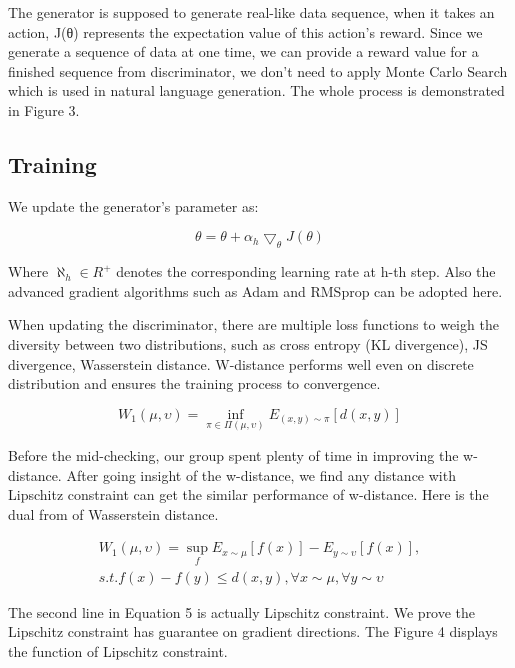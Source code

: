 \documentclass{acmtog} %
\begin{document}
The generator is supposed to generate real-like data sequence, when it takes an action, J(θ) represents the expectation value of this action’s reward. Since we generate a sequence of data at one time, we can provide a reward value for a finished sequence from discriminator, we don’t need to apply Monte Carlo Search which is used in natural language generation.
The whole process is demonstrated in Figure 3.

\subsection{Training}
We update the generator’s parameter as:

\begin{equation}
\theta = \theta + \alpha_{h} \bigtriangledown_{\theta} J(\theta)
\label{eq:samplevar}
\end{equation}

Where $\aleph_{h} \in R^{+}$ denotes the corresponding learning rate at h-th step. Also the advanced gradient algorithms such as Adam and RMSprop can be adopted here.

When updating the discriminator, there are multiple loss functions to weigh the diversity between two distributions, such as cross entropy (KL divergence), JS divergence, Wasserstein distance. W-distance performs well even on discrete distribution and ensures the training process to convergence.

\begin{equation}
W_1(\mu,\upsilon) = \inf_{\pi \in \Pi(\mu,\upsilon)} E_{(x,y) \sim \pi} [d(x,y)]
\label{eq:samplevar}
\end{equation}

Before the mid-checking, our group spent plenty of time in improving the w-distance. After going insight of the w-distance, we find any distance with Lipschitz constraint can get the similar performance of w-distance. Here is the dual from of Wasserstein distance.

\begin{equation}
\begin{split}
W_1(\mu,\upsilon) = \sup_{f} E_{x \sim \mu} [f(x)] - E_{y \sim \upsilon} [f(x)], \\
s.t. f(x) - f(y) \le d(x,y), \forall x \sim \mu, \forall y \sim \upsilon
\label{eq:samplevar}
\end{split}
\end{equation}

The second line in Equation 5 is actually Lipschitz constraint. We prove the Lipschitz constraint has guarantee on gradient directions. The Figure 4 displays the function of Lipschitz constraint.
\end{document}
